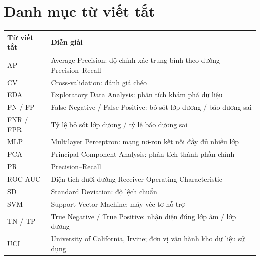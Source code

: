 \chapter*{Danh mục từ viết tắt}
{}
\begin{longtable}{p{}p{}}
\toprule
Từ viết tắt & Diễn giải \\
\midrule
AP & Average Precision: độ chính xác trung bình theo đường Precision–Recall \\
CV & Cross-validation: đánh giá chéo \\
EDA & Exploratory Data Analysis: phân tích khám phá dữ liệu \\
FN / FP & False Negative / False Positive: bỏ sót lớp dương / báo dương sai \\
FNR / FPR & Tỷ lệ bỏ sót lớp dương / tỷ lệ báo dương sai \\
MLP & Multilayer Perceptron: mạng nơ-ron kết nối đầy đủ nhiều lớp \\
PCA & Principal Component Analysis: phân tích thành phần chính \\
PR & Precision–Recall \\
ROC-AUC & Diện tích dưới đường Receiver Operating Characteristic \\
SD & Standard Deviation: độ lệch chuẩn \\
SVM & Support Vector Machine: máy véc-tơ hỗ trợ \\
TN / TP & True Negative / True Positive: nhận diện đúng lớp âm / lớp dương \\
UCI & University of California, Irvine; đơn vị vận hành kho dữ liệu sử dụng \\
\bottomrule
\end{longtable}
